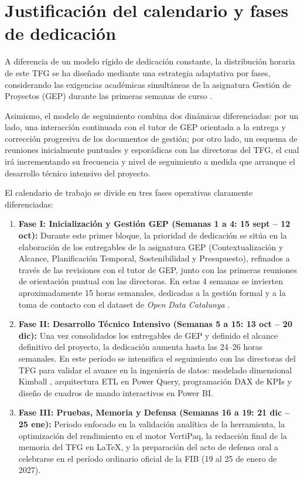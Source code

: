 \documentclass[12pt, a4paper, twoside]{report}
\begin{document}
\newpage\section{Justificación del calendario y fases de dedicación}
A diferencia de un modelo rígido de dedicación constante, la distribución horaria de este TFG se ha diseñado mediante una estrategia adaptativa por fases, considerando las exigencias académicas simultáneas de la asignatura Gestión de Proyectos (GEP) durante las primeras semanas de curso \cite{pmi2021pmbok}.

Asimismo, el modelo de seguimiento combina dos dinámicas diferenciadas: por un lado, una interacción continuada con el tutor de GEP orientada a la entrega y corrección progresiva de los documentos de gestión; por otro lado, un esquema de reuniones inicialmente puntuales y esporádicas con las directoras del TFG, el cual irá incrementando su frecuencia y nivel de seguimiento a medida que arranque el desarrollo técnico intensivo del proyecto.

El calendario de trabajo se divide en tres fases operativas claramente diferenciadas:

\begin{enumerate}[itemsep=7pt]
    \item \textbf{Fase I: Inicialización y Gestión GEP (Semanas 1 a 4: 15 sept -- 12 oct):} Durante este primer bloque, la prioridad de dedicación se sitúa en la elaboración de los entregables de la asignatura GEP (Contextualización y Alcance, Planificación Temporal, Sostenibilidad y Presupuesto), refinados a través de las revisiones con el tutor de GEP, junto con las primeras reuniones de orientación puntual con las directoras. En estas 4 semanas se invierten aproximadamente 15 horas semanales, dedicadas a la gestión formal y a la toma de contacto con el dataset de \textit{Open Data Catalunya} \cite{transparencia_catalunya_2024}.
    
    \item \textbf{Fase II: Desarrollo Técnico Intensivo (Semanas 5 a 15: 13 oct -- 20 dic):} Una vez consolidados los entregables de GEP y definido el alcance definitivo del proyecto, la dedicación aumenta hasta las 24--26 horas semanales. En este período se intensifica el seguimiento con las directoras del TFG para validar el avance en la ingeniería de datos: modelado dimensional Kimball \cite{kimball2013data}, arquitectura ETL en Power Query, programación DAX de KPIs \cite{ferrari2016definitive} y diseño de cuadros de mando interactivos en Power BI.
    
    \item \textbf{Fase III: Pruebas, Memoria y Defensa (Semanas 16 a 19: 21 dic -- 25 ene):} Periodo enfocado en la validación analítica de la herramienta, la optimización del rendimiento en el motor VertiPaq, la redacción final de la memoria del TFG en \LaTeX, y la preparación del acto de defensa oral a celebrarse en el período ordinario oficial de la FIB (19 al 25 de enero de 2027).
\end{enumerate}
\end{document}

